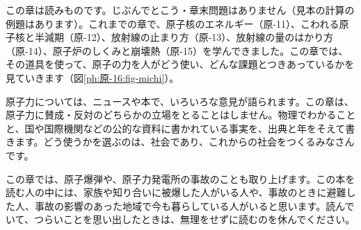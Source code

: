 この章は読みものです。じぶんでとこう・章末問題はありません（見本の計算の例題はあります）。これまでの章で、原子核のエネルギー（原-11）、こわれる原子核と半減期（原-12）、放射線の止まり方（原-13）、放射線の量のはかり方（原-14）、原子炉のしくみと崩壊熱（原-15）を学んできました。この章では、その道具を使って、原子の力を人がどう使い、どんな課題とつきあっているかを見ていきます（図\ref{ph:原-16:fig-michi}）。

原子力については、ニュースや本で、いろいろな意見が語られます。この章は、原子力に賛成・反対のどちらかの立場をとることはしません。物理でわかることと、国や国際機関などの公的な資料に書かれている事実を、出典と年をそえて書きます。どう使うかを選ぶのは、社会であり、これからの社会をつくるみなさんです。

この章では、原子爆弾や、原子力発電所の事故のことも取り上げます。この本を読む人の中には、家族や知り合いに被爆した人がいる人や、事故のときに避難した人、事故の影響のあった地域で今も暮らしている人がいると思います。読んでいて、つらいことを思い出したときは、無理をせずに読むのを休んでください。
\begin{bkfigure}
\label{ph:原-16:fig-michi}
\end{bkfigure}

